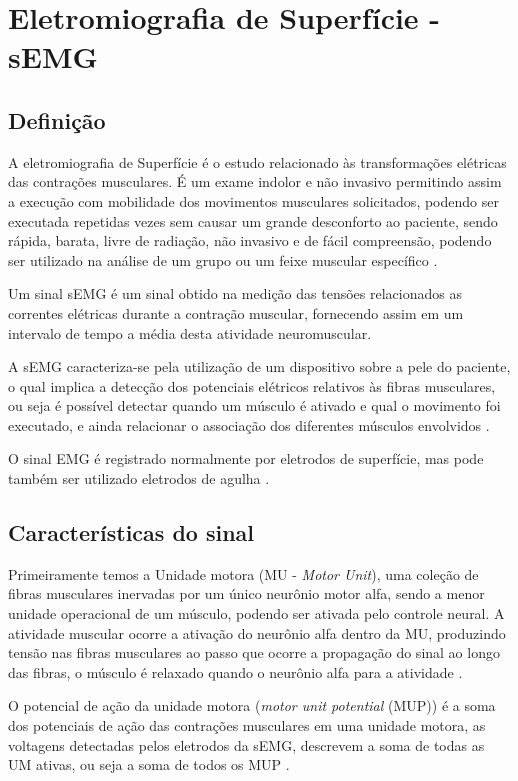 \chapter{Eletromiografia de Superfície - sEMG}
\section{Definição}
A eletromiografia de Superfície é o estudo relacionado às transformações elétricas das contrações musculares. É um exame indolor e não invasivo permitindo assim a execução com mobilidade dos movimentos musculares solicitados, podendo ser executada repetidas vezes sem causar um grande desconforto ao paciente, sendo rápida, barata, livre de radiação, não invasivo e de fácil compreensão, podendo ser utilizado na análise de um grupo ou um feixe muscular específico \cite{de2010eletromiografia}.

Um sinal sEMG é um sinal obtido na medição das tensões relacionados as correntes elétricas durante a contração muscular, fornecendo assim em um intervalo de tempo a média desta atividade neuromuscular\cite{reaz2006techniques}.

A sEMG caracteriza-se pela utilização de um dispositivo sobre a pele do paciente, o qual implica a detecção dos potenciais elétricos relativos às fibras musculares, ou seja é possível detectar quando um músculo é ativado e qual o movimento foi executado, e ainda relacionar o associação dos diferentes músculos envolvidos \cite{botelho2010avaliaccao}.

O sinal EMG é registrado normalmente por eletrodos de superfície, mas pode também ser utilizado eletrodos de agulha \cite{eftaxias2015detection}.

\section{Características do sinal}

Primeiramente temos a Unidade motora (MU - \textit{Motor Unit}), uma coleção de fibras musculares inervadas por um único neurônio motor alfa, sendo a menor unidade operacional de um músculo, podendo ser ativada pelo controle neural. A atividade muscular ocorre a ativação do neurônio alfa dentro da MU, produzindo tensão nas fibras musculares ao passo que ocorre a propagação do sinal ao longo das fibras, o músculo é relaxado quando o neurônio alfa para a atividade \cite{yousefi2014characterizing}.

O potencial de ação da unidade motora (\textit{motor unit potential} (MUP)) é a soma dos potenciais de ação das contrações musculares em uma unidade motora, as voltagens detectadas pelos eletrodos da sEMG, descrevem a soma de todas as UM ativas, ou seja a soma de todos os MUP \cite{yousefi2014characterizing}.

